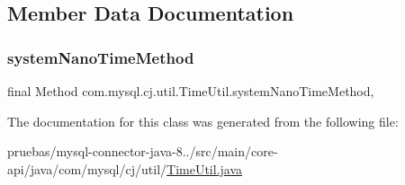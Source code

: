 \subsection{Member Data Documentation}
\mbox{\label{classcom_1_1mysql_1_1cj_1_1util_1_1_time_util_ae26197a4c1007ca664e0be1cc14ca3e2}} 
\subsubsection{\texorpdfstring{system\+Nano\+Time\+Method}{systemNanoTimeMethod}}
{\footnotesize\ttfamily final Method com.\+mysql.\+cj.\+util.\+Time\+Util.\+system\+Nano\+Time\+Method\hspace{0.3cm}{\ttfamily [static]}, {\ttfamily [protected]}}



The documentation for this class was generated from the following file\+:\begin{DoxyCompactItemize}
\item 
pruebas/mysql-\/connector-\/java-\/8../src/main/core-\/api/java/com/mysql/cj/util/\mbox{\hyperlink{_time_util_8java}{Time\+Util.\+java}}\end{DoxyCompactItemize}
